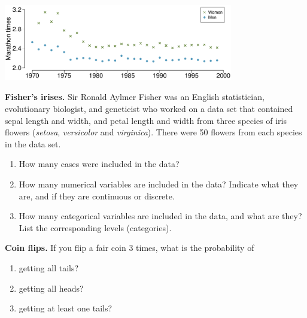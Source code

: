 \documentclass[12pt]{article}
\newcommand{\qt}[1]{\textcolor{custom_carnelian}{\textbf{#1.}}}
\begin{document}
\begin{center}
\includegraphics[width=0.75\textwidth]{figures/marathon_winners_time_series.pdf} \\
\end{center}
{}
\vspace{2cm}



\qt{Fisher's irises\label{fisher_irises}} Sir Ronald Aylmer Fisher was an 
English statistician, evolutionary biologist, and geneticist who worked on a 
data set that contained sepal length and width, and petal length and width from 
three species of iris flowers (\textit{setosa}, \textit{versicolor} and 
\textit{virginica}). There were 50 flowers from each species in the data set. 

\begin{enumerate}
\item How many cases were included in the data?
\vspace{.5cm}
\item How many numerical variables are included in the data? Indicate what 
they are, and if they are continuous or discrete.
\vspace{1cm}
\item How many categorical variables are included in the data, and what are 
they? List the corresponding levels (categories).
\vspace{2.5cm}
\end{enumerate}

\qt{Coin flips\label{coin_flips}} If you flip a fair coin 3 times, what is 
the probability of
\begin{enumerate}
\item getting all tails? 
\item getting all heads? 
\item getting at least one tails? 
\end{enumerate}
\clearpage
\end{document}
